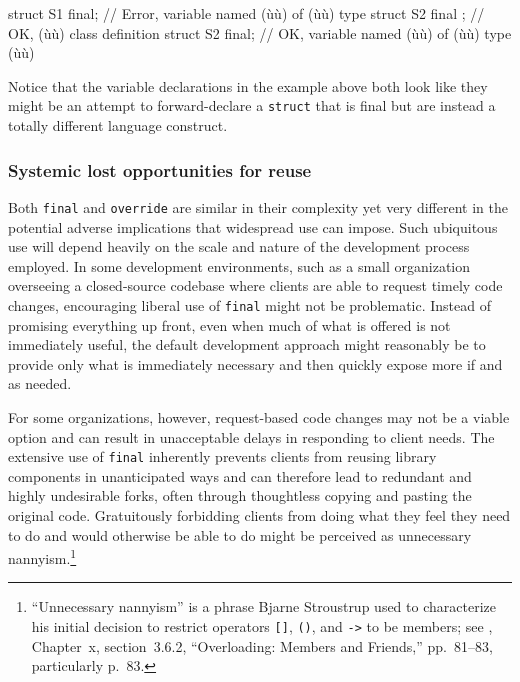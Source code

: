{\begin{emcppslisting}
struct S1 final;      // Error, variable named (ù{}ù) of (ù{}ù) type
struct S2 final { };  // OK, (ù{}ù) class definition
struct S2 final;      // OK, variable named (ù{}ù) of (ù{}ù) type (ù{}ù)
\end{emcppslisting}
    

\noindent Notice that the variable declarations in the example above both look
like they might be an attempt to forward-declare a \lstinline!struct! that
is final but are instead a totally different language construct.

\subsubsection[Systemic lost opportunities for reuse]{Systemic lost opportunities for reuse}\label{systemic-lost-opportunities-for-reuse}

Both \lstinline!final! and \lstinline!override! are similar in their
complexity yet very different in the potential adverse implications that
widespread use can impose. Such ubiquitous use will depend heavily on
the scale and nature of the development process employed. In some
development environments, such as a small organization overseeing a
closed-source codebase where clients are able to request timely code
changes, encouraging liberal use of \lstinline!final! might not be
problematic. Instead of promising everything up front, even when much of
what is offered is not immediately useful, the default development
approach might reasonably be to provide only what is immediately
necessary and then quickly expose more if and as needed.

For some organizations, however, request-based code changes may not be a
viable option and can result in unacceptable delays in responding to
client needs. The extensive use of \lstinline!final! inherently prevents
clients from reusing library components in unanticipated ways and can
therefore lead to redundant and highly undesirable forks, often through
thoughtless copying and pasting the original code. Gratuitously
forbidding clients from doing what they feel they need to do and would
otherwise be able to do might be perceived as unnecessary
nannyism.{\cprotect\footnote{``Unnecessary nannyism'' is a phrase Bjarne
Stroustrup used to characterize his initial decision to restrict
operators \lstinline![]!, \lstinline!()!, and \lstinline!->! to be members; see
\cite{stroustrup94}, Chapter~x, section~3.6.2, ``Overloading: Members and
Friends,'' pp.~81--83, particularly p.~83.
%  
}}

}
